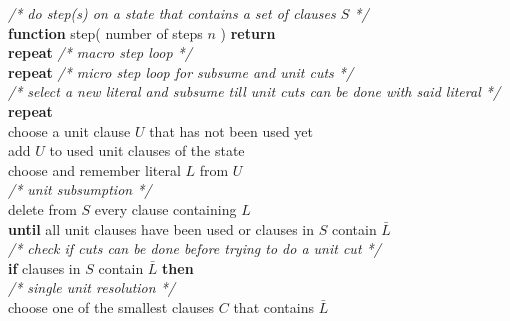 \begin{listing}[h!]
    \textit{/* do step(s) on a state that contains a set of clauses $S$ */}\\
    \textbf{function} step( number of steps $n$ ) \textbf{return}\\
        \hspace*{0.5cm} \textbf{repeat} \textit{/* macro step loop */}\\
            \hspace*{1.0cm} \textbf{repeat} \textit{/* micro step loop for subsume and unit cuts */}\\
                \hspace*{1.5cm} \textit{/* select a new literal and subsume till unit cuts can be done with said literal */}\\
                \hspace*{1.5cm} \textbf{repeat}\\
                    \hspace*{2cm} choose a unit clause $U$ that has not been used yet\\
                    \hspace*{2cm} add $U$ to used unit clauses of the state\\
                    \hspace*{2cm} choose and remember literal $L$ from $U$\\
                    \hspace*{2cm} \textit{/* unit subsumption */}\\
                    \hspace*{2cm} delete from $S$ every clause containing $L$\\
                \hspace*{1.5cm} \textbf{until} all unit clauses have been used or clauses in $S$ contain $\bar{L}$\\
                \hspace*{1.5cm} \textit{/* check if cuts can be done before trying to do a unit cut */}\\
                \hspace*{1.5cm} \textbf{if} clauses in $S$ contain $\bar{L}$ \textbf{then}\\
                    \hspace*{1.5cm} \textit{/* single unit resolution */}\\
                    \hspace*{2cm} choose one of the smallest clauses $C$ that contains $\bar{L}$\\

\end{listing}
